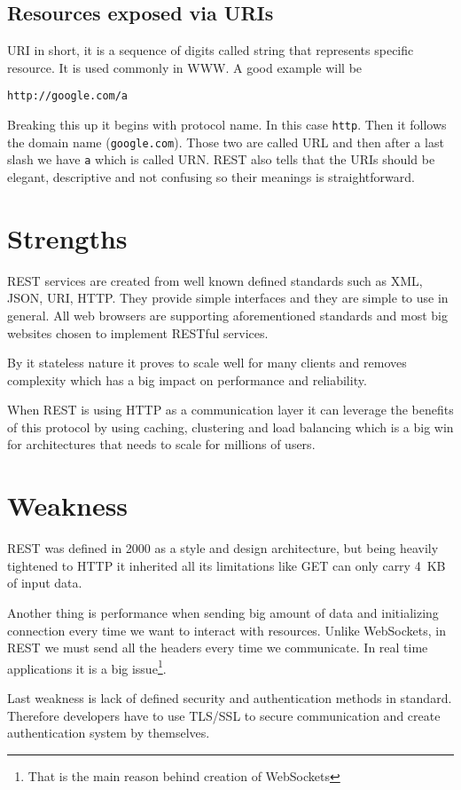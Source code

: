 \subsection{Resources exposed via URIs}
\label{sec:resources}
URI\cite{URI-wiki} in short, it is a sequence of digits called string that represents specific resource. It is used commonly in WWW\@. A good example will be
\begin{verbatim}
http://google.com/a
\end{verbatim}
Breaking this up it begins with protocol name. In this case \verb|http|. Then it follows the domain name (\verb|google.com|). Those two are called URL and then after a last slash we have \verb|a| which is called URN\@. REST also tells that the URIs should be elegant, descriptive and not confusing so their meanings is straightforward.

\section{Strengths}
REST services are created from well known defined standards such as XML, JSON, URI, HTTP\@. They provide simple interfaces and they are simple to use in general. All web browsers are supporting aforementioned standards and most big websites chosen to implement RESTful services.

By it stateless nature it proves to scale well for many clients and removes complexity which has a big impact on performance and reliability.

When REST is using HTTP as a communication layer it can leverage the benefits of this protocol by using caching, clustering and load balancing which is a big win for architectures that needs to scale for millions of users.

\section{Weakness}
REST was defined in 2000\cite{REST-wiki} as a style and design architecture, but being heavily tightened to HTTP it inherited all its limitations like GET can only carry 4~KB of input data\cite[p.~3]{restful-web-services}.

Another thing is performance when sending big amount of data and initializing connection every time we want to interact with resources. Unlike WebSockets, in REST we must send all the headers every time we communicate. In real time applications it is a big issue\footnote{That is the main reason behind creation of WebSockets}.

Last weakness is lack of defined security and authentication methods in standard. Therefore developers have to use TLS/SSL to secure communication and create authentication system by themselves.

